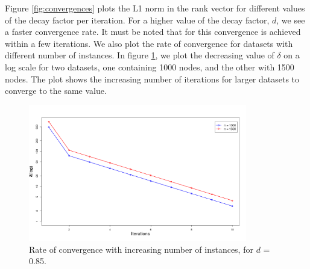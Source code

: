 Figure \ref{fig:convergences} plots the L1 norm in the rank vector for different values of the decay factor per iteration. For a higher value of the decay factor, $d$, we see a faster convergence rate. It must be noted that for this convergence is achieved within a few iterations. We also plot the rate of convergence for datasets with different number of instances. In figure \ref{fig:convergences-inreasing-nodes}, we plot the decreasing value of $\delta$ on a log scale for two datasets, one containing 1000 nodes, and the other with 1500 nodes. The plot shows the increasing number of iterations for larger datasets to converge to the same value.

\begin{figure}[h]
\centering
\includegraphics[width=0.85\textwidth]{media/chapter6/convergence-with-node-change.png}
\caption{Rate of convergence with increasing number of instances, for $d$ = 0.85.}
\label{fig:convergences-inreasing-nodes}
\end{figure}

